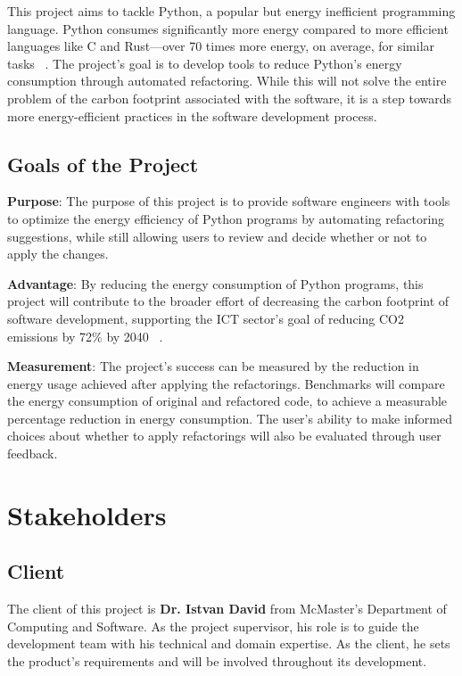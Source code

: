 \documentclass[12pt]{article}
\begin{document}
This project aims to tackle Python, a popular but energy inefficient programming language. Python consumes significantly more energy compared to more efficient languages like C and Rust—over 70 times more energy, on average, for similar tasks ~\citep{PereiraEtAl2017}. The project's goal is to develop tools to reduce Python's energy consumption through automated refactoring. While this will not solve the entire problem of the carbon footprint associated with the software, it is a step towards more energy-efficient practices in the software development process.

\subsection{Goals of the Project}
\noindent \textbf{Purpose}: The purpose of this project is to provide software engineers with tools to optimize the energy efficiency of Python programs by automating refactoring suggestions, while still allowing users to review and decide whether or not to apply the changes.

\noindent \textbf{Advantage}: By reducing the energy consumption of Python programs, this project will contribute to the broader effort of decreasing the carbon footprint of software development, supporting the ICT sector's goal of reducing CO2 emissions by 72\% by 2040 ~\citep{FreitagAndBernersLee2021}.

\noindent \textbf{Measurement}: The project's success can be measured by the reduction in energy usage 
achieved after applying the refactorings. Benchmarks will compare the energy consumption of original 
and refactored code, to achieve a measurable percentage reduction in energy consumption. The user's 
ability to make informed choices about whether to apply refactorings will also be evaluated through 
user feedback.

\section{Stakeholders}
\subsection{Client}
The client of this project is \textbf{Dr. Istvan David} from McMaster's Department of Computing and Software. As the project supervisor, his role is to guide the development team with his technical and domain expertise. As the client, he sets the product's requirements and will be involved throughout its development. 
\end{document}
